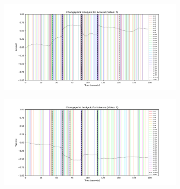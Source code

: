 \documentclass[11pt, letterpaper]{article}
\begin{document}
\begin{figure}
        \centering
    \begin{subfigure}[t]{0.49\textwidth}
        \centering
        \includegraphics[width=\linewidth]{changepoints_V7_arousal_avg} 
        \caption{} \label{fig:changepoints_V7_arousal_avg}
    \end{subfigure}
    \hfill
    \begin{subfigure}[t]{0.49\textwidth}
        \centering
        \includegraphics[width=\linewidth]{changepoints_V7_valence_avg} 
        \caption{} \label{fig:changepoints_V7_valence_avg}
    \end{subfigure}

    \vspace{1cm}
    

\end{figure}
\end{document}
